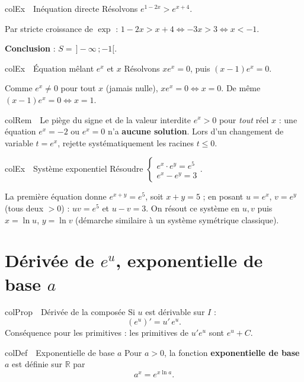 \documentclass[11pt,a4paper]{article}
\newenvironment{definition}[1][Définition]
  {\begin{fiche}{colDef}{\ding{110}~~#1}}{\end{fiche}}
\newenvironment{propriete}[1][Propriété]
  {\begin{fiche}{colProp}{\ding{72}~~#1}}{\end{fiche}}
\newenvironment{exemple}[1][Exemple]
  {\begin{fiche}{colEx}{\ding{217}~~#1}}{\end{fiche}}
\newenvironment{remarque}[1][Remarque]
  {\begin{fiche}{colRem}{\ding{43}~~#1}}{\end{fiche}}
\begin{document}
\begin{exemple}[Inéquation directe]
Résolvons $e^{1-2x}>e^{x+4}$.

\smallskip
Par stricte croissance de $\exp$ : $1-2x>x+4 \iff -3x>3 \iff x<-1$.

\smallskip
\textbf{Conclusion} : $S=\,]-\infty\,;-1[$.
\end{exemple}

\begin{exemple}[Équation mêlant $e^x$ et $x$]
Résolvons $xe^x=0$, puis $(x-1)e^x=0$.

\smallskip
Comme $e^x\ne0$ pour tout $x$ (jamais nulle), $xe^x=0 \iff x=0$. De même $(x-1)e^x=0\iff x=1$.
\end{exemple}

\begin{remarque}[Le piège du signe et de la valeur interdite]
$e^x>0$ pour \emph{tout} réel $x$ : une équation $e^x=-2$ ou $e^x=0$ n'a \textbf{aucune solution}. Lors d'un changement de variable $t=e^x$, rejette systématiquement les racines $t\leq0$.
\end{remarque}

\begin{exemple}[Système exponentiel]
Résoudre $\begin{cases} e^x\cdot e^y=e^5 \\ e^x - e^y = 3 \end{cases}$.

\smallskip
La première équation donne $e^{x+y}=e^5$, soit $x+y=5$ ; en posant $u=e^x$, $v=e^y$ (tous deux $>0$) : $uv=e^5$ et $u-v=3$. On résout ce système en $u,v$ puis $x=\ln u$, $y=\ln v$ (démarche similaire à un système symétrique classique).
\end{exemple}

\section{Dérivée de $e^u$, exponentielle de base $a$}

\begin{propriete}[Dérivée de la composée]
Si $u$ est dérivable sur $I$ :
\[
  \left(e^{u}\right)' = u'\,e^{u}.
\]
Conséquence pour les primitives : les primitives de $u'e^u$ sont $e^u+C$.
\end{propriete}

\begin{definition}[Exponentielle de base $a$]
Pour $a>0$, la fonction \textbf{exponentielle de base $a$} est définie sur $\mathbb{R}$ par
\[
  a^x = e^{x\ln a}.
\]
\end{definition}
\end{document}
